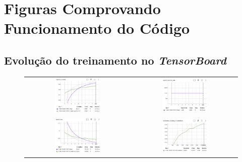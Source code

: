 \documentclass[a4paper,12pt]{article}
\begin{document}
\newpage

\section{Figuras Comprovando Funcionamento do Código}
\subsection{Evolução do treinamento no \textit{TensorBoard}}
\begin{figure}[htbp]
    \centering
    \begin{tabular}{cc}
        \includegraphics[width=0.45\textwidth]{epoch_accuracy.png} &
        \includegraphics[width=0.45\textwidth]{epoch_learning_rate.png} \\
        \includegraphics[width=0.45\textwidth]{epoch_loss.png} &
        \includegraphics[width=0.45\textwidth]{evaluatoion_acc_vs_iterations.png} \\

\end{tabular}
\end{figure}
\end{document}
